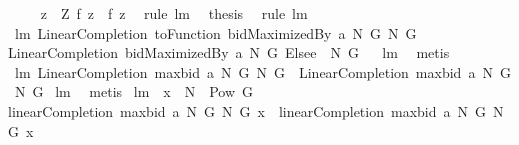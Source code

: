 \begin{isabellebody}
%
\isadelimproof
%
\endisadelimproof
%
\isatagproof
{}\isamarkupfalse%
\ {\isacharminus}\ \isanewline
{}\isamarkupfalse%
\ {\isachardoublequoteopen}{\isasymforall}\ z\ {\isasymin}\ {\isacharquery}Z{\isachardot}\ {\isacharquery}f{}\ z\ {\isacharequal}\ {\isacharquery}f{}\ z{\isachardoublequoteclose}\ \isamarkupfalse%
\ {\isacharparenleft}rule\ lm{}{}{\isacharparenright}\ \isamarkupfalse%
\ {\isacharquery}thesis\ \isamarkupfalse%
\ {\isacharparenleft}rule\ lm{}{}{\isacharparenright}\isanewline
{}\isamarkupfalse%
%
\endisatagproof
{\isafoldproof}%
%
\isadelimproof
\isanewline
%
\endisadelimproof
\isanewline
{}\isamarkupfalse%
\ lm{}{}{\isacharcolon}\ {\isachardoublequoteopen}LinearCompletion\ {\isacharparenleft}toFunction\ {\isacharparenleft}bidMaximizedBy\ a\ N\ G{\isacharparenright}{\isacharparenright}\ N\ G\ {\isacharequal}\isanewline
LinearCompletion\ {\isacharparenleft}{\isacharparenleft}bidMaximizedBy\ a\ N\ G{\isacharparenright}\ Elsee\ {}{\isacharparenright}\ N\ G{\isachardoublequoteclose}%
\isadelimproof
\ %
\endisadelimproof
%
\isatagproof
{}\isamarkupfalse%
\ lm{}{}\ \isamarkupfalse%
\ metis%
\endisatagproof
{\isafoldproof}%
%
\isadelimproof
%
\endisadelimproof
\isanewline
\isanewline
{}\isamarkupfalse%
\ lm{}{}{\isacharcolon}\ {\isachardoublequoteopen}LinearCompletion\ {\isacharparenleft}maxbid{\isacharprime}\ a\ N\ G{\isacharparenright}\ N\ G\ {\isacharequal}\ LinearCompletion\ {\isacharparenleft}maxbid\ a\ N\ G{\isacharparenright}\ N\ G{\isachardoublequoteclose}\isanewline
%
\isadelimproof
%
\endisadelimproof
%
\isatagproof
{}\isamarkupfalse%
\ lm{}{}\ \isamarkupfalse%
\ metis%
\endisatagproof
{\isafoldproof}%
%
\isadelimproof
\isanewline
%
\endisadelimproof
\isanewline
\isanewline
\isanewline
{}\isamarkupfalse%
\ lm{}{}{\isacharcolon}\ \ {\isachardoublequoteopen}x\ {\isasymin}\ {\isacharparenleft}N\ {\isasymtimes}\ {\isacharparenleft}Pow\ G\ {\isacharminus}\ {\isacharbraceleft}{\isacharbraceleft}{\isacharbraceright}{\isacharbraceright}{\isacharparenright}{\isacharparenright}{\isachardoublequoteclose}\ \ \isanewline
{\isachardoublequoteopen}linearCompletion{\isacharprime}\ {\isacharparenleft}maxbid{\isacharprime}\ a\ N\ G{\isacharparenright}\ N\ G\ x\ {\isacharequal}\ linearCompletion\ {\isacharparenleft}maxbid\ a\ N\ G{\isacharparenright}\ N\ G\ x{\isachardoublequoteclose}\isanewline

\end{isabellebody}
